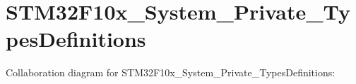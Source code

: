 \section{S\+T\+M32\+F10x\+\_\+\+System\+\_\+\+Private\+\_\+\+Types\+Definitions}
\label{group___s_t_m32_f10x___system___private___types_definitions}
Collaboration diagram for S\+T\+M32\+F10x\+\_\+\+System\+\_\+\+Private\+\_\+\+Types\+Definitions\+:
